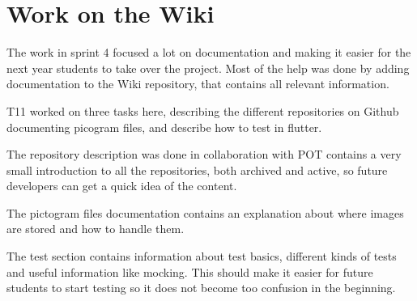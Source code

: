 \section{Work on the Wiki}
The work in sprint 4 focused a lot on documentation and making it easier for the next year students to take over the project. Most of the help was done by adding documentation to the Wiki repository, that contains all relevant information. 

\gls{T11} worked on three tasks here, describing the different repositories on Github documenting picogram files, and describe how to test in flutter. 

The repository description was done in collaboration with \gls{POT} contains a very small introduction to all the repositories, both archived and active, so future developers can get a quick idea of the content.

The pictogram files documentation contains an explanation about where images are stored and how to handle them.

The test section contains information about test basics, different kinds of tests and useful information like mocking. This should make it easier for future students to start testing so it does not become too confusion in the beginning.